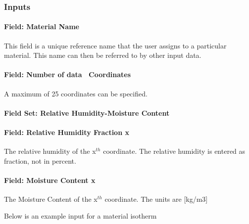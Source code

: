 \subsubsection{Inputs}\label{inputs-8-024}

\paragraph{Field: Material Name}\label{field-material-name-1}

This field is a unique reference name that the user assigns to a particular material. This name can then be referred to by other input data.

\paragraph{Field: Number of data ~Coordinates}\label{field-number-of-data-coordinates}

A maximum of 25 coordinates can be specified.

\paragraph{Field Set: Relative Humidity-Moisture Content}\label{field-set-relative-humidity-moisture-content}

\paragraph{Field: Relative Humidity Fraction x}\label{field-relative-humidity-fraction-x}

The relative humidity of the x\(^{th}\) coordinate. The relative humidity is entered as fraction, not in percent.

\paragraph{Field: Moisture Content x}\label{field-moisture-content-x}

The Moisture Content of the x\(^{th}\) coordinate. The units are {[}kg/m3{]}

Below is an example input for a material isotherm

